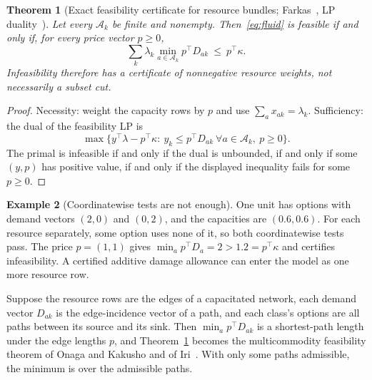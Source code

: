 \documentclass[11pt]{article}
\newtheorem{theorem}{Theorem}
\theoremstyle{definition}
\newtheorem{example}[theorem]{Example}
\theoremstyle{remark}
\begin{document}
\begin{theorem}[Exact feasibility certificate for resource bundles; Farkas~\cite{farkas}, LP
duality~\cite{bertsimas}]\label{thm:bundle}
Let every $\mathcal A_k$ be finite and nonempty. Then~\eqref{eq:fluid} is feasible if and only if, for
every price vector $p\ge0$,
\[
\sum_k\lambda_k\min_{a\in\mathcal A_k}p^\top D_{ak}\ \le\ p^\top\kappa .
\]
Infeasibility therefore has a certificate of nonnegative resource weights, not necessarily a subset
cut.
\end{theorem}
\begin{proof}
Necessity: weight the capacity rows by $p$ and use $\sum_ax_{ak}=\lambda_k$. Sufficiency: the dual of
the feasibility LP is
\[
\max\big\{y^\top\lambda-p^\top\kappa:\ y_k\le p^\top D_{ak}\ \forall a\in\mathcal A_k,\ p\ge0\big\}.
\]
The primal is infeasible if and only if the dual is unbounded, if and only if some $(y,p)$ has positive
value, if and only if the displayed inequality fails for some $p\ge0$.
\end{proof}
\begin{example}[Coordinatewise tests are not enough]\label{ex:coordinatewise}
One unit has options with demand vectors $(2,0)$ and $(0,2)$, and the capacities are $(0.6,0.6)$.
For each resource separately, some option uses none of it, so both coordinatewise tests pass. The price
$p=(1,1)$ gives $\min_a p^\top D_a=2>1.2=p^\top\kappa$ and certifies infeasibility. A certified
additive damage allowance can enter the model as one more resource row.
\end{example}
Suppose the resource rows are the edges of a capacitated network, each demand vector $D_{ak}$ is the
edge-incidence vector of a path, and each class's options are all paths between its source and its
sink. Then $\min_a p^\top D_{ak}$ is a shortest-path length under the edge lengths $p$, and
Theorem~\ref{thm:bundle} becomes the multicommodity feasibility theorem of Onaga and Kakusho and of
Iri~\cite{onaga71,iri71}. With only some paths admissible, the minimum is over the admissible paths.
\end{document}
